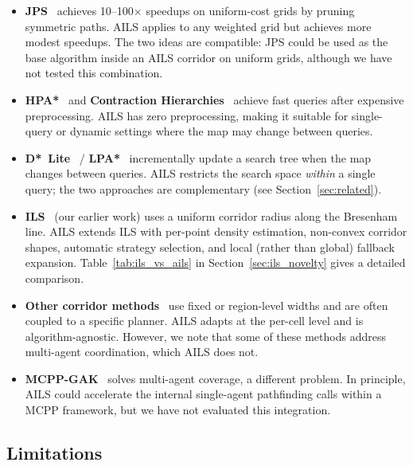 \documentclass[journal]{IEEEtran}
\begin{document}
\begin{itemize}
    \item \textbf{JPS}~\cite{harabor2011online} achieves 10--100$\times$ speedups on uniform-cost grids by pruning symmetric paths.
    AILS applies to any weighted grid but achieves more modest speedups.
    The two ideas are compatible: JPS could be used as the base algorithm inside an AILS corridor on uniform grids, although we have not tested this combination.

    \item \textbf{HPA*}~\cite{botea2004near} and \textbf{Contraction Hierarchies}~\cite{geisberger2008contraction} achieve fast queries after expensive preprocessing.
    AILS has zero preprocessing, making it suitable for single-query or dynamic settings where the map may change between queries.

    \item \textbf{D*~Lite}~\cite{koenig2002d} / \textbf{LPA*}~\cite{koenig2004lifelong} incrementally update a search tree when the map changes between queries.
    AILS restricts the search space \emph{within} a single query; the two approaches are complementary (see Section~\ref{sec:related}).

    \item \textbf{ILS}~\cite{elshahed2025ils} (our earlier work) uses a uniform corridor radius along the Bresenham line.
    AILS extends ILS with per-point density estimation, non-convex corridor shapes, automatic strategy selection, and local (rather than global) fallback expansion.
    Table~\ref{tab:ils_vs_ails} in Section~\ref{sec:ils_novelty} gives a detailed comparison.

    \item \textbf{Other corridor methods}~\cite{huang2024corridor,cohen2023corridor,wu2023corridor,wang2025adaptive} use fixed or region-level widths and are often coupled to a specific planner.
    AILS adapts at the per-cell level and is algorithm-agnostic.
    However, we note that some of these methods address multi-agent coordination, which AILS does not.

    \item \textbf{MCPP-GAK}~\cite{lee2025mcpp} solves multi-agent coverage, a different problem.
    In principle, AILS could accelerate the internal single-agent pathfinding calls within a MCPP framework, but we have not evaluated this integration.
\end{itemize}

\subsection{Limitations}
\end{document}
